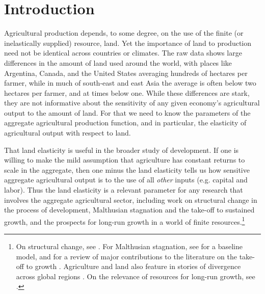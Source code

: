 \documentclass[11pt]{article}
\begin{document}
\pagebreak 

\section{Introduction}
\onehalfspacing 
Agricultural production depends, to some degree, on the use of the finite (or inelastically supplied) resource, land. Yet the importance of land to production need not be identical across countries or climates. The raw data shows large differences in the amount of land used around the world, with places like Argentina, Canada, and the United States averaging hundreds of hectares per farmer, while in much of south-east and east Asia the average is often below two hectares per farmer, and at times below one. While these differences are stark, they are not informative about the sensitivity of any given economy's agricultural output to the amount of land. For that we need to know the parameters of the aggregate agricultural production function, and in particular, the elasticity of agricultural output with respect to land.

That land elasticity is useful in the broader study of development. If one is willing to make the mild assumption that agriculture has constant returns to scale in the aggregate, then one minus the land elasticity tells us how sensitive aggregate agricultural output is to the use of all \textit{other} inputs (e.g. capital and labor). Thus the land elasticity is a relevant parameter for any research that involves the aggregate agricultural sector, including work on structural change in the process of development, Malthusian stagnation and the take-off to sustained growth, and the prospects for long-run growth in a world of finite resources.\footnote{On structural change, see \cite{Gollin:2007oq,Restuccia:2008hc,weilwilde2009,Gollin:2010ys,ev2016clim}. For Malthusian stagnation, see \cite{ashraf2010dynamics} for a baseline model, and \citet{Galor:2011uq} for a review of major contributions to the literature on the take-off to growth \citep{gw00,galor2002natural,Hansen:2002fk,doepke2004accounting,cs2005,lagerlof2006,craftsmills2009,strulik2008population}. Agriculture and land also feature in stories of divergence across global regions \citep{kp2001,galor2008trading,vollrath2011,vv08,vv13,cs2015}. On the relevance of resources for long-run growth, see \cite{perettovalente2015}.} 
\end{document}
